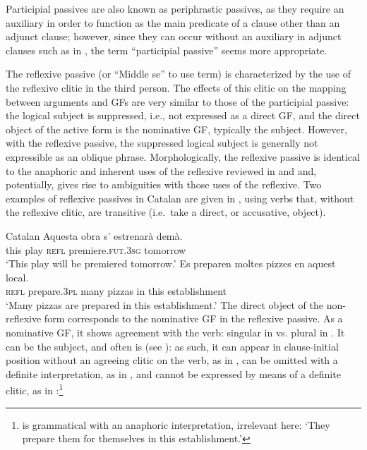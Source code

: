 \documentclass[output=paper,hidelinks]{langscibook}
\begin{document}
Participial passives are also known as periphrastic passives, as they require an auxiliary in order to function as the main predicate of a clause other than an adjunct clause; however, since they can occur without an auxiliary in adjunct clauses such as in , the term ``participial passive'' seems more appropriate.

The reflexive passive (or ``Middle se'' to use  term) is characterized by the use of the reflexive clitic in the third person. The effects of this clitic on the mapping between arguments and GFs are very similar to those of the participial passive: the logical subject is suppressed, i.e., not expressed as a direct GF, and the direct object of the active form is the nominative GF, typically the subject. However, with the reflexive passive, the suppressed logical subject is generally not expressible as an oblique phrase. Morphologically, the reflexive passive is identical to the anaphoric and inherent uses of the reflexive reviewed in  and  and, potentially, gives rise to ambiguities with those uses of the reflexive. Two examples of reflexive passives in Catalan are given in , using verbs that, without the reflexive clitic, are transitive (i.e.\ take a direct, or accusative, object).

\newpage

\ea\label{ex:Romance:43} Catalan
\ea\label{ex:Romance:43a}
\gll Aquesta obra s' estrenarà demà.\\
  this play \textsc{refl} premiere.\textsc{fut.3sg} tomorrow\\
\glt  `This play will be premiered tomorrow.'
\ex\label{ex:Romance:43b}
\gll
Es preparen moltes pizzes en aquest local.\\
 \textsc{refl} prepare.\textsc{3pl} many pizzas in this establishment\\
 \glt `Many pizzas are prepared in this establishment.'
 \z\z
The direct object of the non-reflexive form corresponds to the nominative GF in the reflexive passive. As a nominative GF, it shows agreement with the verb: singular in  vs. plural in . It can be the subject, and often is (see ): as such, it can appear in clause-initial position without an agreeing clitic on the verb, as in , can be omitted with a definite interpretation, as in , and cannot be expressed by means of a definite clitic, as in :\footnote{ is grammatical with an anaphoric interpretation, irrelevant here: `They prepare them for themselves in this establishment.'}
\end{document}
